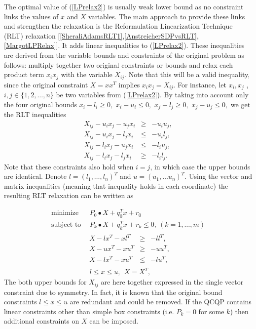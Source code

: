 \documentclass[12pt]{book}
\theoremstyle{definition}
\begin{document}
The optimal value of (\ref{LPrelax2}) is usually weak lower bound as no constraint links the values of $x$ and $X$ variables.
The main approach to provide these links and strengthen the relaxation is the Reformulation Linearization Technique (RLT) relaxation [\ref{SheraliAdamsRLT1},\ref{AnstreicherSDPvsRLT},\ref{MargotLPRelax}].
It adds linear inequalities to (\ref{LPrelax2}). These inequalities are derived from the variable bounds and 
constraints of the original problem as follows: multiply together two original constraints or bounds and relax 
each product term $x_ix_j$ with the variable $X_{ij}$. Note that this will be a valid inequality, since the original constraint $X=xx^T$ implies $x_ix_j = X_{ij}$. For instance, let $x_i, x_j$ , $i,j\in \{1, 2,\dots ,n\}$ be two variables from
(\ref{LPrelax2}). By taking into account only the four original bounds $x_i - l_i \geq 0,$ $x_i - u_i \leq 0 ,$ $ x_j - l_j \geq 0,$  $ x_j - u_j \leq 0,$ we get the RLT inequalities
\begin{equation}
\begin{array}{lcl}
X_{ij} - u_ix_j - u_jx_i  &\geq & -u_iu_j ,\\
X_{ij} - u_ix_j - l_jx_i  &\leq & -u_il_j ,\\
X_{ij} - l_ix_j - u_jx_i  &\leq & -l_iu_j ,\\
X_{ij} - l_ix_j - l_jx_i   &\geq & -l_il_j .
\end{array}
\end{equation}
 Note that these constraints also hold when $i = j$, in which case the upper bounds are identical. Denote $l = (l_1,\dots ,l_n)^T$ and $u = (u_1,\dots u_n)^T.$
 Using the vector and matrix inequalities (meaning that inequality holds in each coordinate) the resulting RLT relaxation can be written as 
 
 \begin{equation}
\label{RLTrelax1} 
\begin{array}{ll}
\mbox{minimize}&\ \ P_0\bullet X + q_0^Tx + r_0\\
\mbox{subject to}&\ \ P_k\bullet X+ q_k^Tx + r_k \leq 0, \  (k = 1,\dots ,m)\\
		& \begin{array}{lcl}
		 X - lx^T - xl^T & \geq & -ll^T, \\
		 X - ux^T - xu^T & \geq & -uu^T, \\
		 X - lx^T - xu^T & \leq & -lu^T, 
		 \end{array}\\
 		&\ \ l\leq x \leq u, \ \  X = X^T,
\end{array} 
\end{equation}
The both upper bounds for $X_{ij}$ are here together expressed in the single vector constraint due to symmetry.
In fact, it is known that the original bound constraints $l\leq x\leq u$ are redundant and could be removed.
If the QCQP contains linear constraints other than simple box constraints (i.e. $P_k=0$ for some $k$) then additional constraints on $X$ can be imposed.
\end{document}
